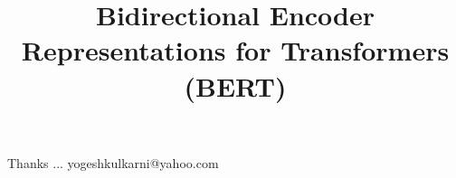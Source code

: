 \documentclass[xcolor=dvipsnames,compress,t,pdf,9pt]{beamer}
\title[\insertframenumber /\inserttotalframenumber]{Bidirectional Encoder Representations for Transformers (BERT)}
\begin{document}
	\begin{frame}
	\titlepage
%
	\end{frame}
	
	
	\begin{frame}[c]{}
	Thanks ...
	\vspace{5mm}
	yogeshkulkarni@yahoo.com
	\end{frame}
\end{document}
